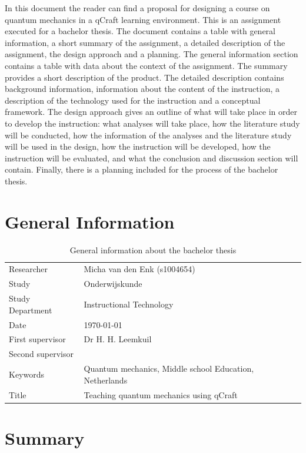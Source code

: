 \documentclass[12pt]{report} %
\begin{document}
In this document the reader can find a proposal for designing a course on quantum mechanics in a qCraft learning environment. This is an assignment executed for a bachelor thesis. The document contains a table with general information, a short summary of the assignment, a detailed description of the assignment, the design approach and a planning. The general information section contains a table with data about the context of the assignment. The summary provides a short description of the product. The detailed description contains background information, information about the content of the instruction, a description of the technology used for the instruction and a conceptual framework. The design approach gives an outline of what will take place in order to develop the instruction: what analyses will take place, how the literature study will be conducted, how the information of the analyses and the literature study will be used in the design, how the instruction will be developed, how the instruction will be evaluated, and what the conclusion and discussion section will contain. Finally, there is a planning included for the process of the bachelor thesis.

\chapter{General Information}

\begin{table}[h]
\begin{center}
\begin{tabular}{ l p{8cm} }
Researcher & Micha van den Enk (s1004654) \\
Study & Onderwijskunde \\
Study Department & Instructional Technology \\ 
Date & \today \\
First supervisor & Dr H. H. Leemkuil \\
Second supervisor & \\
Keywords & Quantum mechanics, Middle school Education, Netherlands \\
Title & Teaching quantum mechanics using qCraft \\
\end{tabular}
\end{center}
\caption{\footnotesize General information about the bachelor thesis}
\end{table}

\chapter{Summary}
\end{document}
